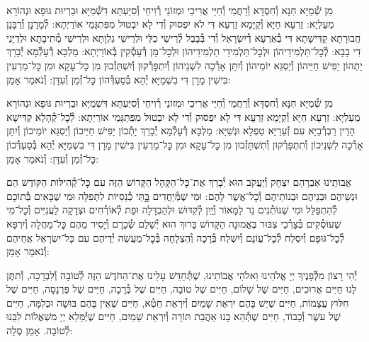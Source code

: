 \documentclass[twoside, openany, parskip=half, 11pt]{book}
\begin{document}

\shabbos\\
מִן שְׁ֯מַיָּא חִנָּא וְ֯חִסְדָּא וְ֯רַחֲמֵי וְ֯חַיֵּי אֲרִיכֵי וּמְזוֹנֵי רְ֯וִיחֵי וְ֯סִיַּעְתָּא דִשְּׁ֯מַיָּא וּבַרְיוּת גּוּפָא וּנְהוֹרָא מַעַלְיָא: זַרְעָא חַיָּא וְ֯קַיָּמָא זַרְעָא דִּי לֹא יִפְסוּק וְ֯דִי לָא יִבְטוּל מִפִּתְגָּמֵי אוֹרַיְתָא: לְ֯מָרָנָן וְ֯רַבָּנָן חֲבוּרָתָא קַדִּישָׁתָא דִּי בְ֯אַרְעָא דְ֯יִשְׂרָאֵל וְ֯דִי בְּ֯בָבֶל לְ֯רֵישֵׁי כַלֵּי וּלְרֵישֵׁי גַלְוָתָא וּלְרֵישֵׁי מְ֯תִיבָתָא וּלְדַיָּנֵי דִי בָבָא: לְ֯כׇל־תַּלְמִידֵיהוֹן וּלְכׇל־תַּלְמִידֵי תַלְמִידֵיהוֹן וּלְכׇל־מָן דְּ֯עָסְ֯קִין בְּ֯אוֹרַיְתָא: מַלְכָּא דְ֯עָלְ֯מָא יְ֯בָרֵךְ יַתְהוֹן יַפִּישׁ חַיֵּיהוֹן וְ֯יַסְגֵּא יוֹמֵיהוֹן וְ֯יִתֵּן אָרְ֯כָה לִשְׁנֵיהוֹן וְ֯יִתְפָּרְ֯קוּן וְ֯יִשְׁתֵּזְ֯בוּן מִן כׇּל־עָקָא וּמִן כׇּל־מַרְעִין בִּישִׁין מָרָן דִּי בִשְׁמַיָּא יְ֯הֵא בְּ֯סַעְדְּ֯הוֹן כׇּל־זְ֯מַן וְ֯עִדָּן: וְ֯נֹאמַר אָמֵן:



מִן שְׁ֯מַיָּא חִנָּא וְ֯חִסְדָּא וְ֯רַחֲמֵי וְ֯חַיֵּי אֲרִיכֵי וּמְזוֹנֵי רְ֯וִיחֵי וְ֯סִיַּעְתָּא דִּשְׁמַיָּא וּבַרְיוּת גּוּפָא וּנְהוֹרָא מַעַלְיָא: זַרְעָא חַיָּא וְ֯קַיָּמָא זַרְעָא דִּי לָא יִפְסוּק וְ֯דִי לָא יִבְטוּל מִפִּתְגָּמֵי אוֹרַיְתָא: לְ֯כׇל־קְ֯הָלָא קַדִּישָׁא הָדֵין רַבְרְ֯בַיָּא עִם זְ֯עֵרַיָּא טַפְלָא וּנְשַׁיָּא: מַלְכָּא דְ֯עָלְ֯מָא יְ֯בָרֵךְ יָתְ֯כוֹן יַפִּישׁ חַיֵּיכוֹן וְ֯יַסְגֵּא יוֹמֵיכוֹן וְ֯יִתֵּן אָרְ֯כָה לִשְׁנֵיכוֹן וְ֯תִתְפָּרְ֯קוּן וְ֯תִשְׁתֵּזְ֯בוּן מִן כׇּל־עָקָא וּמִן כׇּל־מַרְעִין בִּישִׁין מָרָן דִּי בִשְׁמַיָּא יְ֯הֵא בְּ֯סַעְדְּ֯כוֹן כׇּל־זְ֯מַן וְ֯עִדָּן: וְ֯נֹאמַר אָמֵן:

אֲבוֹתֵֽינוּ אַבְרָהָם יִצְחָק וְ֯יַעֲקֹב הוּא יְ֯בָרֵךְ אֶת־כׇּל־הַקָּהָל הַקָּדוֹשׁ הַזֶּה עִם כׇּל־קְ֯הִילּוֹת הַקּוֹדֶשׁ הֵם וּנְשֵׁיהֶם וּבְנֵיהֶם וּבְנוֹתֵיהֶם וְ֯כׇל־אֲשֶׁר לָהֶם: וּמִי שֶׁמְּ֯יַחֲדִים בׇׇׇּתֵּי כְ֯נֵסִיּוֹת לִתְפִלָּה וּמִי שֶׁבָּאִים בְּ֯תוֹכָם לְ֯הִתְפַּלֵּל וּמִי שֶׁנּוֹתְ֯נִים נֵר לַמָּאוֹר וְ֯יַֽיִן לְ֯קִדּוּשׁ וּלְהַבְדָּלָה וּפַת לְ֯אוֹרְ֯חִים וּצְדָקָה לַעֲנִיִּים וְ֯כׇל־מִי שֶׁעוֹסְ֯קִים בְּ֯צָרְ֯כֵי צִבּוּר בֶּאֱמוּנָה הַקָּדוֹשׁ בָּרוּךְ הוּא יְ֯שַׁלֵם שְׂ֯כָרָם וְ֯יָסִיר מֵהֶם כׇּל־מַחֲלָה וְ֯יִרְפָּא לְ֯כׇל־גּוּפָם וְ֯יִסְלַח לְ֯כׇל־עֲוֹנָם וְ֯יִשְׁלַח בְּ֯רָכָה וְ֯הַצְלָחָה בְּ֯כׇל־מַעֲשֵׂה יְ֯דֵיהֶם עִם כָּל־יִשְׂרָאֵל אֲחֵיהֶם וְ֯נֹאמַר אָמֵן:







יְ֯הִי רָצוֹן מִלְּ֯פָנֶיךָ יְיָ אֱלֹהֵינוּ וֵאלֹהֵי אֲבוֹתֵינוּ,
שֶׁתְּ֯חַדֵּשׁ עָלֵינוּ אֶת־הַחֹדֶשׁ הַזֶּה לְ֯טוֹבָה וְ֯לִבְרָכָה,
וְ֯תִתֶּן לָנוּ חַיִּים אֲרוּכִים,
חַיִּים שֶׁל שָׁלוֹם,
חַיִּים שֶׁל טוֹבָה,
חַיִּים שֶׁל בְּ֯רָכָה,
חַיִּים שֶׁל פַּרְנָסָה,
חַיִּים שֶׁל חִלּוּץ עֲצָמוֹת,
חַיִּים שֶׁיֵשׁ בָּהֶם יִרְאַת שָׁמַיִם וְ֯יִרְאַת חֵטְ֯א,
חַיִּים שֶׁאֵין בָּהֶם בּוּשָׁה וּכְלִמָּה,
חַיִּים שֶׁל עשֶׁר וְ֯כָבוֹד,
חַיִּים שֶׁתְּ֯הֵא בָנוּ אַהֲבַת תּוֹרָה וְ֯יִרְאַת שָׁמַיִם,
חַיִּים שֶׁיְּ֯מַּלֵא יְיָ מִשְׁאֲלוֹת לִבֵּנוּ לְ֯טוֹבָה. אָמֵן סֶלָה:
\end{document}
